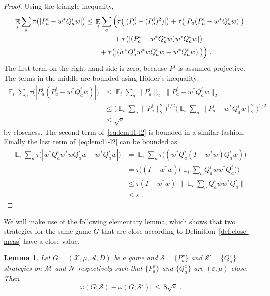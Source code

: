 \documentclass[11pt]{article}
\newtheorem{lemma}[theorem]{Lemma}
\theoremstyle{definition}
\newcommand{\strategy}{\mathscr{S}}
\DeclareMathOperator*{\Expectation}{\mathbb{E}}
\newcommand{\Es}[1]{\Expectation_{#1}}
\newcommand{\mA}{\ensuremath{\mathcal{A}}}
\newcommand{\mM}{\ensuremath{\mathcal{M}}}
\newcommand{\mX}{\ensuremath{\mathcal{X}}}
\newcommand{\eps}{\varepsilon}
\newcommand{\mN}{\mathcal{N}}
\begin{document}
\begin{proof}
Using the triangle inequality, 
\begin{align}
\Es{i} \sum_a \tau\big(|P^i_a - w^* Q^i_a w|\big) &\leq\, \Es{i}\sum_a \Big(\tau\big(|(P^i_a-(P^i_a)^2)|\big) + \tau\big(|P_a(P^i_a-w^*Q^i_aw)|\big) \notag\\
&\qquad\qquad+ \tau\big(|(P^i_a-w^*Q^i_aw)w^*Q^i_aw|\big) \notag \\
 \label{eq:lem:l1-l2}
&\qquad +\tau\big(| (w^*Q^i_aw^*wQ^i_aw-w^*Q^i_aw)|\big)\Big)\;.
\end{align}
The first term on the right-hand side is zero, because $P^i$ is assumed projective. The terms in the middle are bounded using H\"older's inequality:
\begin{align*}
\Es{i}\sum_a  \tau\big(|P^i_a(P^i_a-w^*Q^i_aw)|\big) &\leq \Es{i} \sum_a \|P^i_a\|_2 \, \, \|P^i_a-w^*Q^i_aw\|_2\\
&\leq \Big(\Es{i}\sum_a \|P^i_a\|^2_2\Big)^{1/2}\Big( \Es{i}\sum_a  \|P^i_a-w^*Q^i_aw\|_2^2 \Big)^{1/2}\\
&\leq \sqrt{\eps}
\end{align*}
by closeness. The second term of~\eqref{eq:lem:l1-l2} is bounded in a similar fashion.
Finally the last term of~\eqref{eq:lem:l1-l2} can be bounded as 
\begin{align*}
\Es{i}\sum_a \tau\big(| w^*Q^i_aw^*wQ^i_aw-w^*Q^i_aw|\big) &= \Es{i}\sum_a \tau\big( (w^*Q^i_a(I - w^*w)Q^i_aw)\big)\\
&=  \tau\Big( (I-w^*w)\Big(\Es{i}\sum_a Q^i_aww^* Q^i_a\Big)\Big)\\
&\leq \tau(I-w^*w) \,\, \Big\|\Es{i}\sum_a Q^i_aww^* Q^i_a\Big\|\\
&\leq \eps\;.
\end{align*}
\end{proof}


We will make use of the following elementary lemma, which shows that two strategies for the same game $G$ that are close according to Definition~\ref{def:close-meas} have a close value. 

\begin{lemma}\label{lem:close-value}
Let $G=(\mX,\mu,\mA,D)$ be a game and $\strategy=\{P^x_a\}$ and $\strategy'=\{Q^x_a\}$ strategies on $\mM$ and $\mN$ respectively such that $\{P^x_a\}$ and $\{Q^x_a\}$ are $(\eps,\mu)$-close. Then 
\[ \big|\omega(G;\strategy) - \omega(G;\strategy')\big|\,\leq\, 8\sqrt{\eps} \;.\]
\end{lemma}
\end{document}
